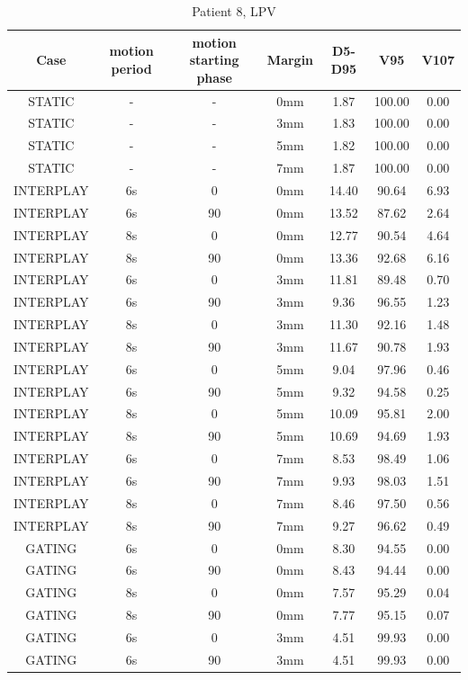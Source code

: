 \documentclass[type=dr, dr=rernat, accentcolor=tud7b,colorbacktitle, bigchapter, openright, twoside, 12pt ]{tudthesis}
\begin{document}
\begin{table}[H]
  \centering
  \caption{Patient 8, LPV}
  \begin{tabular}{|c||c|c|c||c|c|c|}
    \hline\hline
    Case & motion period & motion starting phase & Margin & D5-D95 & V95 & V107\\
    \hline 
STATIC & - & - & 0mm & 1.87 & 100.00 & 0.00 \\
STATIC & - & - & 3mm & 1.83 & 100.00 & 0.00 \\
STATIC & - & - & 5mm & 1.82 & 100.00 & 0.00 \\
STATIC & - & - & 7mm & 1.87 & 100.00 & 0.00 \\
INTERPLAY & 6s & 0 & 0mm & 14.40 & 90.64 & 6.93 \\
INTERPLAY & 6s & 90 & 0mm & 13.52 & 87.62 & 2.64 \\
INTERPLAY & 8s & 0 & 0mm & 12.77 & 90.54 & 4.64 \\
INTERPLAY & 8s & 90 & 0mm & 13.36 & 92.68 & 6.16 \\
INTERPLAY & 6s & 0 & 3mm & 11.81 & 89.48 & 0.70 \\
INTERPLAY & 6s & 90 & 3mm & 9.36 & 96.55 & 1.23 \\
INTERPLAY & 8s & 0 & 3mm & 11.30 & 92.16 & 1.48 \\
INTERPLAY & 8s & 90 & 3mm & 11.67 & 90.78 & 1.93 \\
INTERPLAY & 6s & 0 & 5mm & 9.04 & 97.96 & 0.46 \\
INTERPLAY & 6s & 90 & 5mm & 9.32 & 94.58 & 0.25 \\
INTERPLAY & 8s & 0 & 5mm & 10.09 & 95.81 & 2.00 \\
INTERPLAY & 8s & 90 & 5mm & 10.69 & 94.69 & 1.93 \\
INTERPLAY & 6s & 0 & 7mm & 8.53 & 98.49 & 1.06 \\
INTERPLAY & 6s & 90 & 7mm & 9.93 & 98.03 & 1.51 \\
INTERPLAY & 8s & 0 & 7mm & 8.46 & 97.50 & 0.56 \\
INTERPLAY & 8s & 90 & 7mm & 9.27 & 96.62 & 0.49 \\
GATING & 6s & 0 & 0mm & 8.30 & 94.55 & 0.00 \\
GATING & 6s & 90 & 0mm & 8.43 & 94.44 & 0.00 \\
GATING & 8s & 0 & 0mm & 7.57 & 95.29 & 0.04 \\
GATING & 8s & 90 & 0mm & 7.77 & 95.15 & 0.07 \\
GATING & 6s & 0 & 3mm & 4.51 & 99.93 & 0.00 \\
GATING & 6s & 90 & 3mm & 4.51 & 99.93 & 0.00 \\

\end{tabular}
\end{table}
\end{document}
